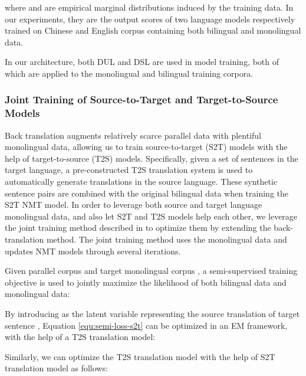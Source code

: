 \documentclass[a4paper]{article}
\begin{document}
\begin{CJK*}{UTF8}{gbsn}
\begin{itemize}
where  and  are empirical marginal distributions induced by the training data. In our experiments, they are the output scores of two language models respectively trained on Chinese and English corpus containing both bilingual and monolingual data.
\end{itemize}

In our architecture, both DUL and DSL are used in model training, both of which are applied to the monolingual and bilingual training corpora.

\subsubsection{Joint Training of Source-to-Target and Target-to-Source Models}
\label{sec-s2t-t2s}

Back translation \cite{sennrich2015improving} augments relatively scarce parallel data with plentiful monolingual data, allowing us to train source-to-target (S2T) models with the help of target-to-source (T2S) models.  
Specifically, given a set of sentences  in the target language, a pre-constructed T2S translation system is used to automatically generate translations  in the source language. These synthetic sentence pairs  are combined with the original bilingual data when training the S2T NMT model.
In order to leverage both source and target language monolingual data, and also let S2T and T2S models help each other,
we leverage the joint training method described in \cite{Joint_S2T_T2S} to optimize them by extending the back-translation method. The joint training method uses the  monolingual data and updates NMT models through several iterations.

Given parallel corpus  and target monolingual corpus  , a semi-supervised training objective is used to jointly maximize the likelihood of both bilingual data and monolingual data:


By introducing  as the latent variable representing the source translation of target sentence , Equation \ref{equ:semi-loss-s2t} can be optimized in an EM framework, with the help of a T2S translation model:


Similarly, we can optimize the T2S translation model with the help of S2T translation model as follows:



\end{CJK*}
\end{document}
